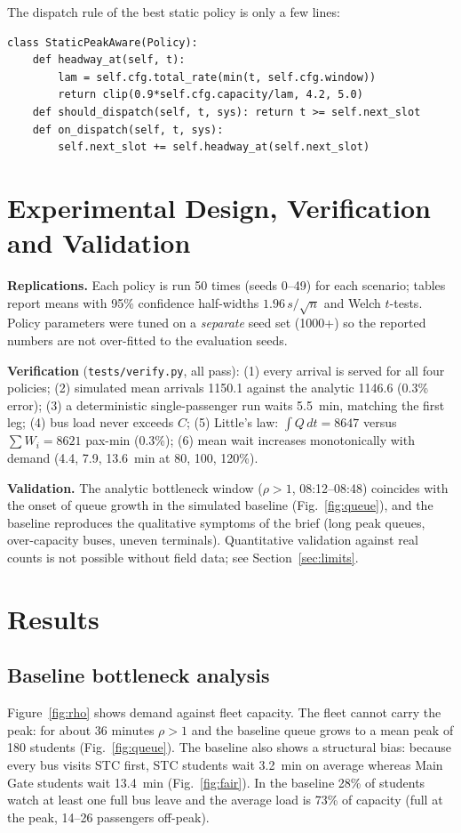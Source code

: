 \documentclass[conference]{IEEEtran}
\begin{document}
The dispatch rule of the best static policy is only a few lines:
\begin{lstlisting}
class StaticPeakAware(Policy):
    def headway_at(self, t):
        lam = self.cfg.total_rate(min(t, self.cfg.window))
        return clip(0.9*self.cfg.capacity/lam, 4.2, 5.0)
    def should_dispatch(self, t, sys): return t >= self.next_slot
    def on_dispatch(self, t, sys):
        self.next_slot += self.headway_at(self.next_slot)
\end{lstlisting}

\section{Experimental Design, Verification and Validation}
\textbf{Replications.} Each policy is run 50 times (seeds 0--49) for each scenario; tables report means with 95\% confidence half-widths $1.96\,s/\sqrt{n}$ and Welch $t$-tests. Policy parameters were tuned on a \emph{separate} seed set (1000+) so the reported numbers are not over-fitted to the evaluation seeds.

\textbf{Verification} (\texttt{tests/verify.py}, all pass): (1) every arrival is served for all four policies; (2) simulated mean arrivals 1150.1 against the analytic 1146.6 (0.3\% error); (3) a deterministic single-passenger run waits 5.5~min, matching the first leg; (4) bus load never exceeds $C$; (5) Little's law: $\int Q\,dt=8647$ versus $\sum W_i=8621$ pax-min (0.3\%); (6) mean wait increases monotonically with demand (4.4, 7.9, 13.6~min at 80, 100, 120\%).

\textbf{Validation.} The analytic bottleneck window ($\rho>1$, 08:12--08:48) coincides with the onset of queue growth in the simulated baseline (Fig.~\ref{fig:queue}), and the baseline reproduces the qualitative symptoms of the brief (long peak queues, over-capacity buses, uneven terminals). Quantitative validation against real counts is not possible without field data; see Section~\ref{sec:limits}.

\section{Results}
\subsection{Baseline bottleneck analysis}
Figure~\ref{fig:rho} shows demand against fleet capacity. The fleet cannot carry the peak: for about 36 minutes $\rho>1$ and the baseline queue grows to a mean peak of 180 students (Fig.~\ref{fig:queue}). The baseline also shows a structural bias: because every bus visits STC first, STC students wait 3.2~min on average whereas Main Gate students wait 13.4~min (Fig.~\ref{fig:fair}). In the baseline 28\% of students watch at least one full bus leave and the average load is 73\% of capacity (full at the peak, 14--26 passengers off-peak).
\end{document}
